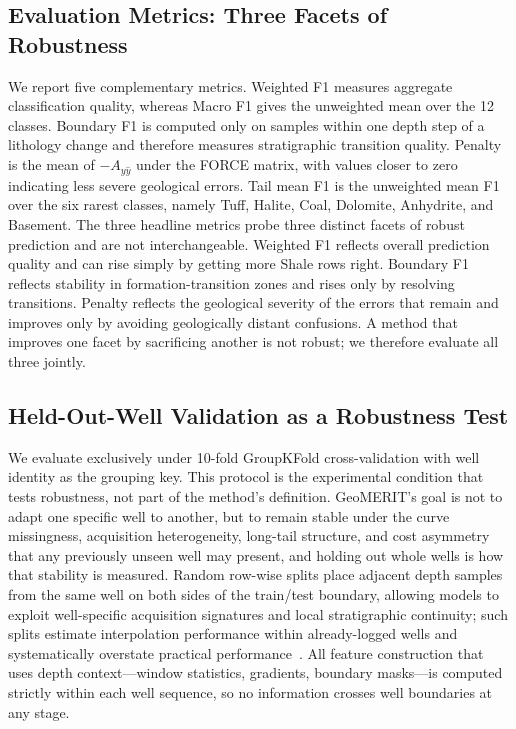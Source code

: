 \documentclass[bdcc,article,submit,pdftex,moreauthors]{Definitions/mdpi}
\begin{document}
\subsection{Evaluation Metrics: Three Facets of Robustness}
\label{sec:metrics}
We report five complementary metrics. Weighted F1 measures aggregate classification quality,
whereas Macro F1 gives the unweighted mean over the 12 classes. Boundary F1 is computed only
on samples within one depth step of a lithology change and therefore measures stratigraphic
transition quality. Penalty is the mean of $-A_{y\hat y}$ under the FORCE matrix, with values
closer to zero indicating less severe geological errors. Tail mean F1 is the unweighted mean
F1 over the six rarest classes, namely Tuff, Halite, Coal, Dolomite, Anhydrite, and Basement. The three headline metrics probe three distinct facets
of robust prediction and are not interchangeable. Weighted F1 reflects overall prediction
quality and can rise simply by getting more Shale rows right. Boundary F1 reflects stability
in formation-transition zones and rises only by resolving transitions. Penalty reflects the
geological severity of the errors that remain and improves only by avoiding geologically
distant confusions. A method that improves one facet by sacrificing another is not robust;
we therefore evaluate all three jointly.

\subsection{Held-Out-Well Validation as a Robustness Test}
\label{sec:protocol}
We evaluate exclusively under 10-fold GroupKFold cross-validation with well identity as the
grouping key. This protocol is the experimental condition that tests robustness, not part of
the method's definition. GeoMERIT's goal is not to adapt one specific well to another, but to
remain stable under the curve missingness, acquisition heterogeneity, long-tail structure,
and cost asymmetry that any previously unseen well may present, and holding out whole wells
is how that stability is measured. Random row-wise splits place adjacent depth samples from
the same well on both sides of the train/test boundary, allowing models to exploit
well-specific acquisition signatures and local stratigraphic continuity; such splits estimate
interpolation performance within already-logged wells and systematically overstate practical
performance~\cite{rosenblatt2024,roberts2017cv,mila2022nndm}. All feature construction that
uses depth context---window statistics, gradients, boundary masks---is computed strictly
within each well sequence, so no information crosses well boundaries at any stage.
\end{document}
